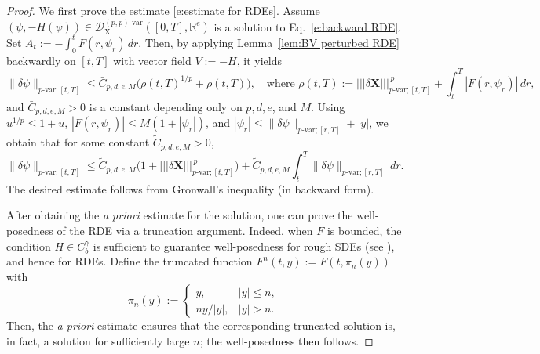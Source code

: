 \documentclass[11pt,reqno]{amsart}
\numberwithin{equation}{section}
\def\R{\mathbb R}
\newcommand{\triplenorm}[1]{%
\left|\!\left|\!\left|#1\right|\!\right|\!\right|%
}
\begin{document}
\begin{proof}
We first prove the estimate \eqref{e:estimate for RDEs}. Assume $(\psi,-H(\psi)) \in \mathscr D^{(p,p)\text{-}\mathrm{var}}_{\mathrm X}([0,T],\R^e)$ is a solution to Eq.~\eqref{e:backward RDE}. 
Set
$A_t:=-\int_0^t F(r,\psi_r)\,dr$. Then, by applying 
Lemma~\ref{lem:BV perturbed RDE} backwardly on $[t,T]$ with vector field $V := - H$, it yields 
\[
\|\delta \psi\|_{p\text{-}\mathrm{var};[t,T]}
\le
\bar C_{p,d,e,M}
\bigl(\rho(t,T)^{1/p} + \rho(t,T)\bigr),
\quad \text{where }  
\rho(t,T)
:=
\triplenorm{\delta \mathbf X}_{p\text{-}\mathrm{var};[t,T]}^{\,p}
 +
 \int_t^T|F(r,\psi_r)|\,dr,
\]
and $\bar C_{p,d,e,M} > 0$ is a constant depending only on $p,d,e$, and $M$. 
Using $u^{1/p}\le1+u$, 
$|F(r,\psi_r)|\le M(1+|\psi_r|)$, and $|\psi_r| \le \|\delta \psi\|_{p\text{-}\mathrm{var};[r,T]} + |y|$, we obtain that for some constant $\tilde C_{p,d,e,M} > 0$, 
\[
\|\delta \psi\|_{p\text{-}\mathrm{var};[t,T]}
\le
\tilde C_{p,d,e,M} \Big(1 + \triplenorm{\delta \mathbf X}_{p\text{-}\mathrm{var};[t,T]}^{\,p}\Big) 
+
\tilde C_{p,d,e,M} \int_t^T \|\delta \psi\|_{p\text{-}\mathrm{var};[r,T]} \,dr.
\]
The desired estimate follows from Gronwall's inequality (in backward form).

After obtaining the \emph{a priori} estimate for the solution, one can prove the well-posedness of the RDE via a truncation argument. Indeed, when $F$ is bounded, the condition $H \in C^{\gamma}_b$ is sufficient to guarantee well-posedness for rough SDEs (see \cite{fhl21}), and hence for RDEs. Define the truncated function $F^{n}(t,y) := F(t,\pi_n (y))$ with 
\begin{equation*}
\pi_n(y):=
\begin{cases}
y, & |y|\le n,\\
n y/{|y|}, & |y|>n.
\end{cases}
\end{equation*}
Then, the \emph{a priori} estimate ensures that the corresponding truncated solution is, in fact, a solution for sufficiently large $n$; the well-posedness then follows. 
\end{proof}
\end{document}
